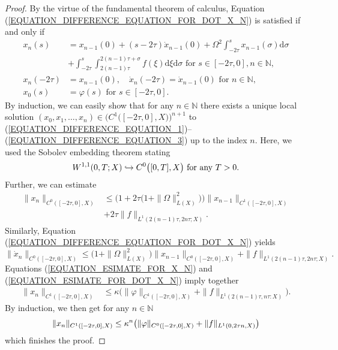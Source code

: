 \documentclass[12pt]{article}
\numberwithin{equation}{section}
\numberwithin{equation}{section}
\begin{document}
	\begin{proof}
		By the virtue of the fundamental theorem of calculus, Equation (\ref{EQUATION_DIFFERENCE_EQUATION_FOR_DOT_X_N}) is satisfied if and only if
		\begin{align}
			x_{n}(s) &= x_{n-1}(0) + (s - 2\tau) \dot{x}_{n-1}(0)
			+ \Omega^{2} \int_{-2\tau}^{s} x_{n-1}(\sigma) \mathrm{d}\sigma \\
			&+ \int_{-2\tau}^{s} \int_{2(n-1)\tau}^{2(n-1)\tau + \sigma} f(\xi) \mathrm{d}\xi \mathrm{d}\sigma \text{ for } s \in [-2\tau, 0], n \in \mathbb{N}, \label{EQUATION_DIFFERENCE_EQUATION_1} \\
			x_{n}(-2\tau) &= x_{n-1}(0), \quad \dot{x}_{n}(-2\tau) = \dot{x}_{n-1}(0) \text{ for } n \in \mathbb{N}, \label{EQUATION_DIFFERENCE_EQUATION_2} \\
			x_{0}(s) &= \varphi(s) \text{ for } s \in [-2\tau, 0]. \label{EQUATION_DIFFERENCE_EQUATION_3}
		\end{align}
		By induction, we can easily show that for any $n \in \mathbb{N}$
		there exists a unique local solution $(x_{0}, x_{1}, \dots, x_{n}) \in \Big(C^{1}\big([-2\tau, 0], X\big)\Big)^{n + 1}$
		to (\ref{EQUATION_DIFFERENCE_EQUATION_1})--(\ref{EQUATION_DIFFERENCE_EQUATION_3}) up to the index $n$.
		Here, we used the Sobolev embedding theorem stating
		\begin{equation}
			W^{1, 1}(0, T; X) \hookrightarrow C^{0}\big([0, T], X\big) \text{ for any } T > 0. \notag
		\end{equation}
		Further, we can estimate
		\begin{equation}
			\begin{split}
				\|x_{n}\|_{C^{0}([-2\tau, 0], X)} &\leq
				\Big(1 + 2\tau \big(1 + \|\Omega\|_{L(X)}^{2}\big)\Big) \|x_{n-1}\|_{C^{1}([-2\tau, 0], X)} \\
				&+ 2 \tau \|f\|_{L^{1}(2(n-1)\tau, 2n\tau; X)}.
			\end{split}
			\label{EQUATION_ESIMATE_FOR_X_N}
		\end{equation}
		Similarly, Equation (\ref{EQUATION_DIFFERENCE_EQUATION_FOR_DOT_X_N}) yields
		\begin{equation}
			\|\dot{x}_{n}\|_{C^{0}([-2\tau, 0], X)} \leq
			\big(1 + \|\Omega\|_{L(X)}^{2}\big) \|x_{n-1}\|_{C^{0}([-2\tau, 0], X)} + \|f\|_{L^{1}(2(n-1)\tau, 2n\tau; X)}.
			\label{EQUATION_ESIMATE_FOR_DOT_X_N}
		\end{equation}
		Equations (\ref{EQUATION_ESIMATE_FOR_X_N}) and (\ref{EQUATION_ESIMATE_FOR_DOT_X_N}) imply together
		\begin{align*}
			\|x_{n}\|_{C^{1}([-2\tau, 0], X)} &\leq
			\kappa \big(\|\varphi\|_{C^{1}([-2\tau, 0], X)} + \|f\|_{L^{1}(2(n-1)\tau, n\tau: X)}\big).
		\end{align*}
		By induction, we then get for any $n \in \mathbb{N}$
		\begin{equation}
			\|x_{n}\|_{C^{1}([-2\tau, 0], X)} \leq
			\kappa^{n} \big(\|\varphi\|_{C^{0}([-2\tau, 0], X)} + \|f\|_{L^{1}(0, 2\tau n, X)}\big) \notag
		\end{equation}
		which finishes the proof.
	\end{proof}
\end{document}
